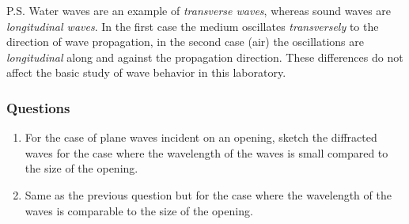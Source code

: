 \documentclass[11pt]{NSF}
\def\ben{\begin{enumerate}}
\def\een{\end{enumerate}}
\def\i{\item{}}
\begin{document}
P.S. Water waves are an example of {\em transverse waves}, 
whereas sound waves are {\em longitudinal waves}. 
In the first case the medium oscillates {\em transversely} to 
the direction of wave propagation, in the second case (air) the 
oscillations are {\em longitudinal} along and against the 
propagation direction. 
These differences do not affect the basic study of wave behavior in this laboratory.

\subsubsection*{Questions}
\ben

\i For the case of plane waves incident on an opening, sketch the 
diffracted waves for the case where the wavelength of the waves is 
small compared to the size of the opening.

\i Same as the previous question but for the case where the 
wavelength of the waves is comparable to the size of the opening.
\een
\end{document}
